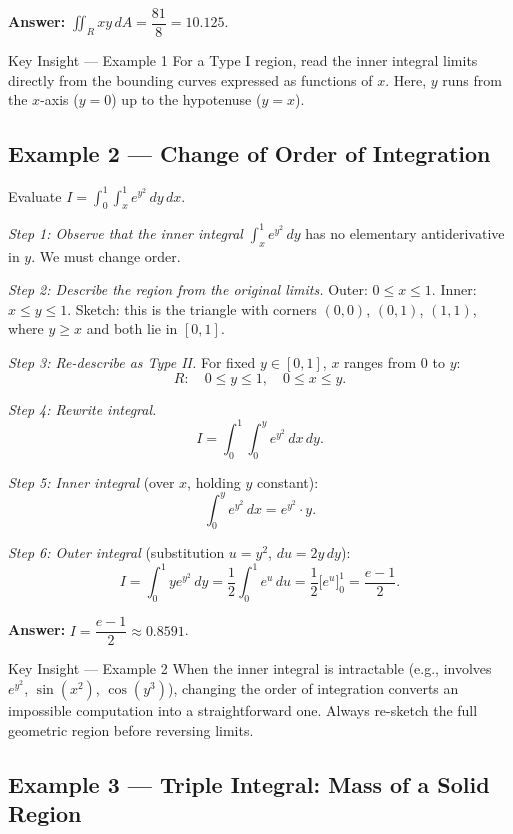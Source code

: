 \documentclass[12pt,a4paper]{article}
\begin{document}
\textbf{Answer:} \(\displaystyle\iint_R xy\,dA = \dfrac{81}{8} = 10.125\).

\begin{learnbox}{Key Insight --- Example 1}
For a Type I region, read the inner integral limits directly from the bounding curves expressed as functions of \(x\). Here, \(y\) runs from the \(x\)-axis (\(y=0\)) up to the hypotenuse (\(y=x\)).
\end{learnbox}

\subsection*{Example 2 --- Change of Order of Integration}

Evaluate \(\displaystyle I = \int_0^1 \int_x^1 e^{y^2}\,dy\,dx\).

\textit{Step 1: Observe that the inner integral} \(\int_x^1 e^{y^2}\,dy\) has no elementary antiderivative in \(y\). We must change order.

\textit{Step 2: Describe the region from the original limits.}
Outer: \(0 \le x \le 1\). Inner: \(x \le y \le 1\).
Sketch: this is the triangle with corners \((0,0)\), \((0,1)\), \((1,1)\), where \(y \ge x\) and both lie in \([0,1]\).

\textit{Step 3: Re-describe as Type II.}
For fixed \(y \in [0,1]\), \(x\) ranges from \(0\) to \(y\):
\[
  R:\quad 0 \le y \le 1,\quad 0 \le x \le y.
\]

\textit{Step 4: Rewrite integral.}
\[
  I = \int_0^1 \int_0^y e^{y^2}\,dx\,dy.
\]

\textit{Step 5: Inner integral} (over \(x\), holding \(y\) constant):
\[
  \int_0^y e^{y^2}\,dx = e^{y^2}\cdot y.
\]

\textit{Step 6: Outer integral} (substitution \(u=y^2\), \(du=2y\,dy\)):
\[
  I = \int_0^1 ye^{y^2}\,dy = \frac{1}{2}\int_0^1 e^u\,du = \frac{1}{2}\bigl[e^u\bigr]_0^1 = \frac{e-1}{2}.
\]

\textbf{Answer:} \(\displaystyle I = \dfrac{e-1}{2} \approx 0.8591\).

\begin{learnbox}{Key Insight --- Example 2}
When the inner integral is intractable (e.g., involves \(e^{y^2}\), \(\sin(x^2)\), \(\cos(y^3)\)), changing the order of integration converts an impossible computation into a straightforward one. Always re-sketch the full geometric region before reversing limits.
\end{learnbox}

\subsection*{Example 3 --- Triple Integral: Mass of a Solid Region}
\end{document}
